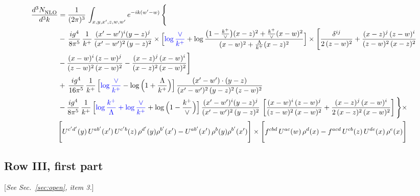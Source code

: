 \documentclass[9pt]{article}
\numberwithin{equation}{section}
\newcommand{\rnote}[1]{{\color{teal}[\textit{#1}]}}
\begin{document}
\begin{align}
     \frac{d^{3}N_{\rm NLO}^{\rm}}{d^{3}k}  & =  \frac{1}{(2\pi)^{3}}\, \int_{x,y,x',z,w,w^{\prime}} e^{-ik(w^{\prime}-w)}\, \Bigg\{\notag \\ & -\,\frac{ig^{4}}{8\pi^{5}}\,\frac{1}{k^{+}}\,\frac{(x'-w')^{i}(y-z)^{j}}{(x'-w')^{2}\,(y-z)^{2}}\times \Big[{\color{blue}\log\frac{\vee}{k^{+}}}+\log\frac{\big(1-\frac{k^{+}}{\vee}\big)(x-z)^{2}+\frac{k^{+}}{\vee}(x-w)^{2}}{(x-w)^{2}+\frac{\Lambda}{k^{+}}(x-z)^{2}}\Big]\times \Bigg[\frac{\delta^{ij}}{2\,(z-w)^{2}}+\frac{(x-z)^{j}\,(z-w)^{i}}{(z-w)^{2}\,(x-z)^{2}}\notag \\ & -\frac{(x-w)^{i}\,(z-w)^{j}}{(z-w)^{2}\,(x-w)^{2}}-\frac{(x-z)^{j}\,(x-w)^{i}}{(x-z)^{2}\,(x-w)^{2}}\Bigg]\notag \\ & +\,\frac{ig^{4}}{16\pi^{5}}\,\frac{1}{k^{+}}\,\Big[{\color{blue}\log\frac{\vee}{k^{+}}}-\log\Big(1+\frac{\Lambda}{k^{+}}\Big)\Big]\, \frac{(x'-w')\cdot (y-z)}{(x'-w')^{2}\,(y-z)^{2}\,(z-w)^{2}}\notag \\ & -\frac{ig^{4}}{8\pi^{5}}\,\frac{1}{k^{+}}\,\Big[{\color{blue}\log\frac{k^{+}}{\Lambda}+\log\frac{\vee}{k^{+}}}+\log\Big(1-\frac{k^{+}}{\vee}\Big)\Big]\,\frac{(x'-w')^{i}(y-z)^{j}}{(x'-w')^{2}\,(y-z)^{2}}\,\left[\frac{(x-w)^{i}\,(z-w)^{j}}{(z-w)^{2}\,(x-w)^{2}}+\frac{(x-z)^{j}\,(x-w)^{i}}{2\,(x-z)^{2}\, (x-w)^{2}}\right]\Bigg\}\times \notag \\ & \Bigg[U^{c'd'}(y)\,U^{ab'}(x')\,U^{c'b}(z)\,\rho^{d'}(y)\rho^{b'}(x')-U^{ab'}(x')\,\rho^{b}(y)\rho^{b'}(x')\Bigg]\times\Bigg[f^{cbd}\,U^{ac}(w)\,\rho^{d}(x)-f^{acd}\, U^{cb}(z)\,U^{de}(x)\,\rho^{e}(x)\Bigg]
\end{align}

\subsection{Row III, first part}

\rnote{See Sec.~\ref{sec:open}, item 3.}
\end{document}
